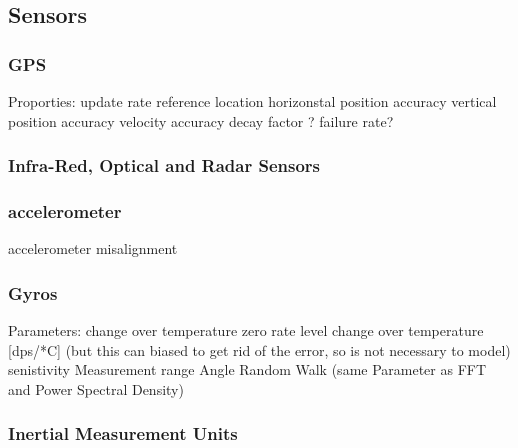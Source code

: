 \subsection{Sensors}
    \subsubsection{GPS}
        Proporties:
            update rate
            reference location
            horizonstal position accuracy
            vertical position accuracy
            velocity accuracy
            decay factor ?
            failure rate?

    \subsubsection{Infra-Red, Optical and Radar Sensors}


    \subsubsection{accelerometer}
        accelerometer misalignment


    \subsubsection{Gyros}
        Parameters:
            change over temperature
            zero rate level change over temperature [dps/*C] (but this can biased to get rid of the error, so is not necessary to model)
            senistivity
            Measurement range
            Angle Random Walk (same Parameter as FFT and Power Spectral Density)

    \subsubsection{Inertial Measurement Units}

